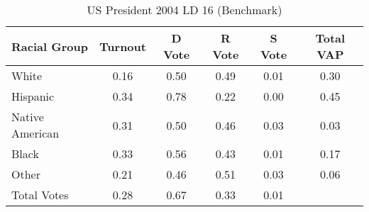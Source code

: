 \begin{table}[htb]
\begin{center}
\caption{US President 2004 LD 16 (Benchmark)}
\label{pres04_vap_ld_16_benchmark}
\begin{tabular}{lccccc}
  \hline
Racial Group & Turnout & D Vote & R Vote & S Vote & Total VAP \\ 
  \hline
White & 0.16 & 0.50 & 0.49 & 0.01 & 0.30 \\ 
  Hispanic & 0.34 & 0.78 & 0.22 & 0.00 & 0.45 \\ 
  Native American & 0.31 & 0.50 & 0.46 & 0.03 & 0.03 \\ 
  Black & 0.33 & 0.56 & 0.43 & 0.01 & 0.17 \\ 
  Other & 0.21 & 0.46 & 0.51 & 0.03 & 0.06 \\ 
  Total Votes & 0.28 & 0.67 & 0.33 & 0.01 &  \\ 
   \hline
\end{tabular}
\end{center}
\end{table}
